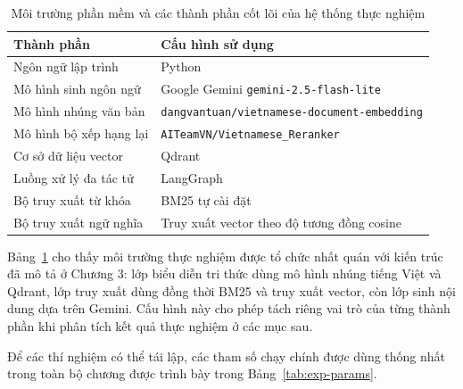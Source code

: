\documentclass[../DoAn.tex]{subfiles}
\begin{document}
\begin{table}[H]
    \centering
    \renewcommand{\arraystretch}{1.25}
    \begin{tabular}{|p{}|p{}|}
        \hline
        \textbf{Thành phần} & \textbf{Cấu hình sử dụng} \\
        \hline
        Ngôn ngữ lập trình & Python \\
        \hline
        Mô hình sinh ngôn ngữ & Google Gemini \texttt{gemini-2.5-flash-lite} \\
        \hline
        Mô hình nhúng văn bản & \texttt{dangvantuan/vietnamese-document-embedding} \\
        \hline
        Mô hình bộ xếp hạng lại & \texttt{AITeamVN/Vietnamese\_Reranker} \\
        \hline
        Cơ sở dữ liệu vector & Qdrant \\
        \hline
        Luồng xử lý đa tác tử & LangGraph \\
        \hline
        Bộ truy xuất từ khóa & BM25 tự cài đặt \\
        \hline
        Bộ truy xuất ngữ nghĩa & Truy xuất vector theo độ tương đồng cosine \\
        \hline
    \end{tabular}
    \vspace{0.2cm}
\caption{Môi trường phần mềm và các thành phần cốt lõi của hệ thống thực nghiệm}
    \label{tab:exp-environment}
\end{table}

Bảng~\ref{tab:exp-environment} cho thấy môi trường thực nghiệm được tổ chức nhất quán với kiến trúc đã mô tả ở Chương 3: lớp biểu diễn tri thức dùng mô hình nhúng tiếng Việt và Qdrant, lớp truy xuất dùng đồng thời BM25 và truy xuất vector, còn lớp sinh nội dung dựa trên Gemini. Cấu hình này cho phép tách riêng vai trò của từng thành phần khi phân tích kết quả thực nghiệm ở các mục sau.

Để các thí nghiệm có thể tái lập, các tham số chạy chính được dùng thống nhất trong toàn bộ chương được trình bày trong Bảng~\ref{tab:exp-params}.
\end{document}
